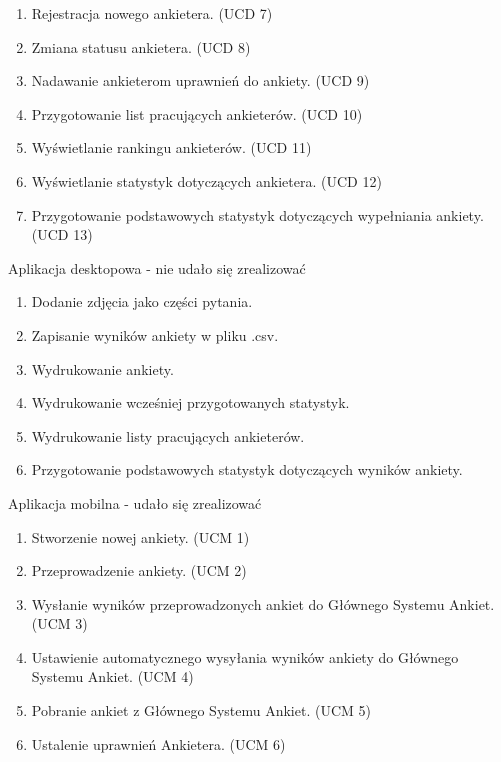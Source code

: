 \documentclass[a4paper,10pt]{beamer}
\begin{document}
		\begin{frame}
			\begin{enumerate}
				\item  Rejestracja nowego ankietera. (UCD 7)
				\item	Zmiana statusu ankietera. (UCD 8)
				\item	Nadawanie ankieterom uprawnień do ankiety. (UCD 9)
				\item	Przygotowanie list pracujących ankieterów. (UCD 10)
				\item	Wyświetlanie rankingu ankieterów. (UCD 11)
				\item	Wyświetlanie statystyk dotyczących ankietera. (UCD 12)
				\item	Przygotowanie podstawowych statystyk dotyczących wypełniania ankiety. (UCD 13)
			\end{enumerate}
		\end{frame}
		
		\begin{frame}{Aplikacja desktopowa - nie udało się zrealizować}
			\begin{enumerate}			
				\item   Dodanie zdjęcia jako części pytania.
				\item   Zapisanie wyników ankiety w pliku .csv.
				\item	Wydrukowanie ankiety.
				\item	Wydrukowanie wcześniej przygotowanych statystyk.
				\item	Wydrukowanie listy pracujących ankieterów.
				\item	Przygotowanie podstawowych statystyk dotyczących wyników ankiety.
			\end{enumerate}
		\end{frame}
		
	
		\begin{frame}{Aplikacja mobilna - udało się zrealizować}
			\begin{enumerate}
				\item Stworzenie nowej ankiety. (UCM 1)
				\item	Przeprowadzenie ankiety. (UCM 2)
				\item	Wysłanie wyników przeprowadzonych ankiet do Głównego Systemu Ankiet. (UCM 3)
				\item	Ustawienie automatycznego wysyłania wyników ankiety do Głównego Systemu Ankiet. (UCM 4)
				\item	Pobranie ankiet z Głównego Systemu Ankiet. (UCM 5)
				\item	Ustalenie uprawnień Ankietera. (UCM 6)	
			\end{enumerate}
		\end{frame}
		
\end{document}
